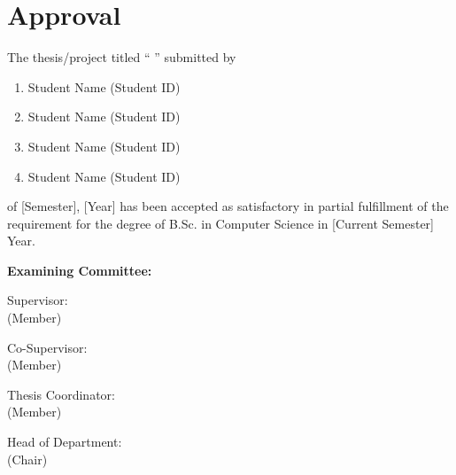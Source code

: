 \section*{Approval}

The thesis/project titled “ ” submitted by 
\begin{enumerate}
  \item Student Name (Student ID)
  \item Student Name (Student ID)
  \item Student Name (Student ID) 
  \item Student Name (Student ID)
\end{enumerate}

of [Semester], [Year] has been accepted as satisfactory in partial fulfillment of the requirement for the degree of B.Sc. in Computer Science in [Current Semester] Year. 

\vspace{0.5cm}
\textbf{Examining Committee:}

\vspace{1cm}

Supervisor:\\
(Member)
\begin{center}
    \hspace{7cm}  \hspace{1cm} 
\end{center}

Co-Supervisor:\\
(Member)
\begin{center}
    \hspace{7cm}  \hspace{1cm} 
\end{center}


Thesis Coordinator:\\
(Member)
\begin{center}
    \hspace{7cm}  \hspace{1cm} 
\end{center}

Head of Department:\\
(Chair)
\begin{center}
    \hspace{7cm}  \hspace{1cm} 
\end{center}

\pagebreak